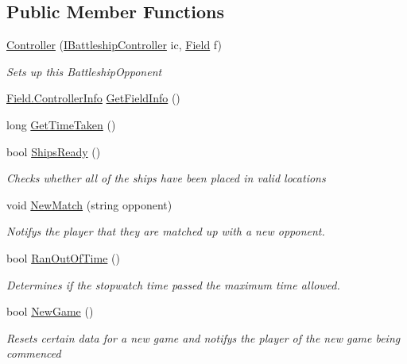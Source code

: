 \subsection*{Public Member Functions}
\begin{DoxyCompactItemize}
\item 
\hyperlink{class_m_b_c_1_1_core_1_1_controller_ada907b30a847119b01f0d52fa6b05633}{Controller} (\hyperlink{interface_m_b_c_1_1_core_1_1_i_battleship_controller}{I\-Battleship\-Controller} ic, \hyperlink{class_m_b_c_1_1_core_1_1_field}{Field} f)
\begin{DoxyCompactList}\small\item\em Sets up this Battleship\-Opponent\end{DoxyCompactList}\item 
\hyperlink{class_m_b_c_1_1_core_1_1_field_1_1_controller_info}{Field.\-Controller\-Info} \hyperlink{class_m_b_c_1_1_core_1_1_controller_af6f8a1a759c38557608ab0faebf49424}{Get\-Field\-Info} ()
\item 
long \hyperlink{class_m_b_c_1_1_core_1_1_controller_afdec43bffe7e30eb0e419c1db641a7f3}{Get\-Time\-Taken} ()
\item 
bool \hyperlink{class_m_b_c_1_1_core_1_1_controller_af4f0b5d25e8b772e7d333d06548d1f4b}{Ships\-Ready} ()
\begin{DoxyCompactList}\small\item\em Checks whether all of the ships have been placed in valid locations\end{DoxyCompactList}\item 
void \hyperlink{class_m_b_c_1_1_core_1_1_controller_a880c9ad7cd60528cad4f36da11bfd9bf}{New\-Match} (string opponent)
\begin{DoxyCompactList}\small\item\em Notifys the player that they are matched up with a new opponent.\end{DoxyCompactList}\item 
bool \hyperlink{class_m_b_c_1_1_core_1_1_controller_a6c4fc9aca31480cdfcbb3d4b1d0fd9e2}{Ran\-Out\-Of\-Time} ()
\begin{DoxyCompactList}\small\item\em Determines if the stopwatch time passed the maximum time allowed.\end{DoxyCompactList}\item 
bool \hyperlink{class_m_b_c_1_1_core_1_1_controller_ae87c31349a7fde4034942a1b505d372d}{New\-Game} ()
\begin{DoxyCompactList}\small\item\em Resets certain data for a new game and notifys the player of the new game being commenced\end{DoxyCompactList}\item 

\end{DoxyCompactItemize}
